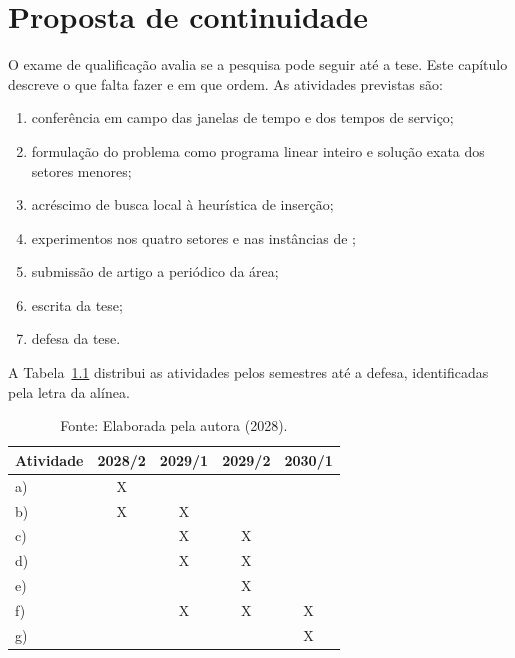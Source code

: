 \documentclass[eq,capa]{texufpel}
\begin{document}
\chapter{Proposta de continuidade}
\label{cap:continuidade}

O exame de qualificação avalia se a pesquisa pode seguir até a tese. Este
capítulo descreve o que falta fazer e em que ordem. As atividades previstas
são:

\begin{enumerate}
  \item conferência em campo das janelas de tempo e dos tempos de serviço;
  \item formulação do problema como programa linear inteiro e solução exata
        dos setores menores;
  \item acréscimo de busca local à heurística de inserção;
  \item experimentos nos quatro setores e nas instâncias de
        \citet{Solomon:1987:AVR};
  \item submissão de artigo a periódico da área;
  \item escrita da tese;
  \item defesa da tese.
\end{enumerate}

A Tabela~\ref{tab:cronograma} distribui as atividades pelos semestres até a
defesa, identificadas pela letra da alínea.

\begin{table}[htbp]
  \caption{Cronograma de atividades até a defesa da tese}
  \label{tab:cronograma}
  \centering
  \begin{tabular}{lcccc}
    \hline
    Atividade & 2028/2 & 2029/1 & 2029/2 & 2030/1 \\
    \hline
    a) & X &   &   &   \\
    b) & X & X &   &   \\
    c) &   & X & X &   \\
    d) &   & X & X &   \\
    e) &   &   & X &   \\
    f) &   & X & X & X \\
    g) &   &   &   & X \\
    \hline
  \end{tabular}
  \caption*{Fonte: Elaborada pela autora (2028).}
\end{table}
\end{document}
